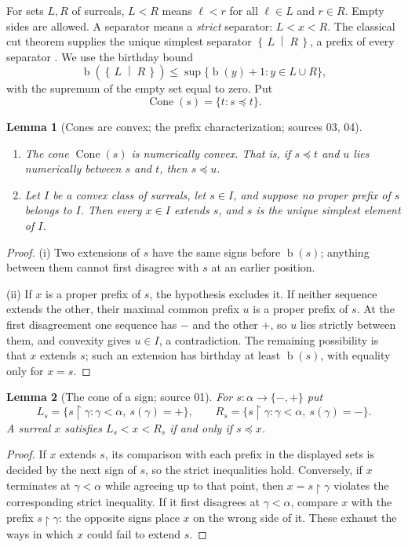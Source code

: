 \documentclass[11pt,letterpaper]{article}
\numberwithin{equation}{section}
\newtheorem{lemma}[lemma]{Lemma}
\theoremstyle{definition}
\theoremstyle{remark}
\newcommand{\bd}{\operatorname{b}}
\newcommand{\Cone}{\operatorname{Cone}}
\newcommand{\res}{\mathbin{\upharpoonright}}
\newcommand{\cut}[2]{\left\{\,#1\;\middle|\;#2\,\right\}}
\begin{document}
For sets $L,R$ of surreals, $L<R$ means $\ell<r$ for all $\ell\in L$ and
$r\in R$. Empty sides are allowed. A separator means a \emph{strict}
separator: $L<x<R$. The classical cut theorem supplies the unique simplest
separator $\cut LR$, a prefix of every separator
\cite{Conway,Gonshor,vdDE}. We use the birthday bound
\begin{equation}\label{univ:eq:cutbirthday}
 \bd\!\left(\cut LR\right)
 \leq\sup\{\bd(y)+1:y\in L\cup R\},
\end{equation}
with the supremum of the empty set equal to zero. Put
\[
 \Cone(s)=\{t:s\preceq t\}.
\]

\begin{lemma}[Cones are convex; the prefix characterization; sources 03, 04]\label{univ:lem:convex}
\begin{enumerate}[label=\textnormal{(\roman*)}]
\item The cone $\Cone(s)$ is numerically convex. That is, if $s\preceq t$
and $u$ lies numerically between $s$ and $t$, then $s\preceq u$.
\item Let $I$ be a convex class of surreals, let $s\in I$, and suppose no
proper prefix of $s$ belongs to $I$. Then every $x\in I$ extends $s$, and $s$
is the unique simplest element of $I$.
\end{enumerate}
\end{lemma}
\begin{proof}
(i) Two extensions of $s$ have the same signs before $\bd(s)$; anything between
them cannot first disagree with $s$ at an earlier position.

(ii) If $x$ is a proper prefix of $s$, the hypothesis excludes it. If neither
sequence extends the other, their maximal common prefix $u$ is a proper
prefix of $s$. At the first disagreement one sequence has $-$ and the other
$+$, so $u$ lies strictly between them, and convexity gives $u\in I$, a
contradiction. The remaining possibility is that $x$ extends $s$; such an
extension has birthday at least $\bd(s)$, with equality only for $x=s$.
\end{proof}

\begin{lemma}[The cone of a sign; source 01]\label{univ:lem:signcone}
For $s:\alpha\to\{-,+\}$ put
\[
 L_s=\{s\res\gamma:\gamma<\alpha,\ s(\gamma)=+\},\qquad
 R_s=\{s\res\gamma:\gamma<\alpha,\ s(\gamma)=-\}.
\]
A surreal $x$ satisfies $L_s<x<R_s$ if and only if $s\preceq x$.
\end{lemma}
\begin{proof}
If $x$ extends $s$, its comparison with each prefix in the displayed sets is
decided by the next sign of $s$, so the strict inequalities hold. Conversely,
if $x$ terminates at $\gamma<\alpha$ while agreeing up to that point, then
$x=s\res\gamma$ violates the corresponding strict inequality. If it first
disagrees at $\gamma<\alpha$, compare $x$ with the prefix $s\res\gamma$: the
opposite signs place $x$ on the wrong side of it. These exhaust the ways in
which $x$ could fail to extend $s$.
\end{proof}
\end{document}
